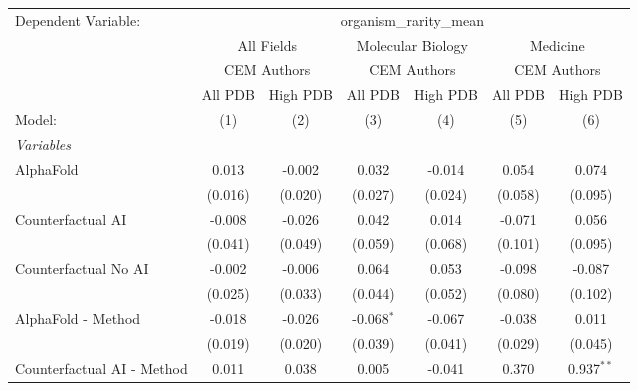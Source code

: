 \begingroup
\centering
\begin{tabular}{lcccccc}
   \tabularnewline \midrule \midrule
   Dependent Variable: & \multicolumn{6}{c}{organism\_rarity\_mean}\\
 & \multicolumn{2}{c}{All Fields} & \multicolumn{2}{c}{Molecular Biology} & \multicolumn{2}{c}{Medicine} \\
\cmidrule(lr){2-3} \cmidrule(lr){4-5} \cmidrule(lr){6-7}
 & \multicolumn{2}{c}{CEM Authors} & \multicolumn{2}{c}{CEM Authors} & \multicolumn{2}{c}{CEM Authors} \\
\cmidrule(lr){2-3} \cmidrule(lr){4-5} \cmidrule(lr){6-7}
 & \multicolumn{1}{c}{All PDB} & \multicolumn{1}{c}{High PDB} & \multicolumn{1}{c}{All PDB} & \multicolumn{1}{c}{High PDB} & \multicolumn{1}{c}{All PDB} & \multicolumn{1}{c}{High PDB} \\
\cmidrule(lr){2-2} \cmidrule(lr){3-3} \cmidrule(lr){4-4} \cmidrule(lr){5-5} \cmidrule(lr){6-6} \cmidrule(lr){7-7}
   Model:                                                     & (1)     & (2)     & (3)          & (4)     & (5)     & (6)\\  
   \midrule
   \emph{Variables}\\
   AlphaFold                                                  & 0.013   & -0.002  & 0.032        & -0.014  & 0.054   & 0.074\\   
                                                              & (0.016) & (0.020) & (0.027)      & (0.024) & (0.058) & (0.095)\\   
   Counterfactual AI                                          & -0.008  & -0.026  & 0.042        & 0.014   & -0.071  & 0.056\\   
                                                              & (0.041) & (0.049) & (0.059)      & (0.068) & (0.101) & (0.095)\\   
   Counterfactual No AI                                       & -0.002  & -0.006  & 0.064        & 0.053   & -0.098  & -0.087\\   
                                                              & (0.025) & (0.033) & (0.044)      & (0.052) & (0.080) & (0.102)\\   
   AlphaFold - Method                                         & -0.018  & -0.026  & -0.068$^{*}$ & -0.067  & -0.038  & 0.011\\   
                                                              & (0.019) & (0.020) & (0.039)      & (0.041) & (0.029) & (0.045)\\   
   Counterfactual AI - Method                                 & 0.011   & 0.038   & 0.005        & -0.041  & 0.370   & 0.937$^{**}$\\   

\end{tabular}
